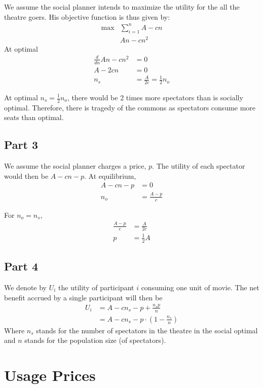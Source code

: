 \documentclass[]{article}
\newcommand{\e}{&=}
\begin{document}
We assume the social planner intends to maximize the utility for the all the theatre goers. His objective function is thus given by:
\begin{align*}
\max & \sum_{i=1}^{n} A - cn \\
	& An - cn^2
\end{align*}
At optimal
\begin{align*}
\frac{d}{dn} An - cn^2 \e 0 \\
A - 2cn \e 0 \\
n_s \e \frac{A}{2c} = \frac{1}{2} n_o
\end{align*}

At optimal $n_s = \frac{1}{2} n_o$, there would be 2 times more spectators than is socially optimal. Therefore, there is tragedy of the commons as spectators consume more seats than optimal.

\subsection*{Part 3}

We assume the social planner charges a price, $p$. The utility of each spectator would then be $A - cn - p$. At equilibrium,
\begin{align*}
A - cn - p \e 0 \\
n_{o} \e \frac{A - p}{c}
\end{align*}

For $n_o = n_s$,
\begin{align*}
\frac{A - p}{c} \e \frac{A}{2c} \\
p \e \frac{1}{2} A
\end{align*}

\subsection*{Part 4}

We denote by $U_i$ the utility of participant $i$ consuming one unit of movie. The net benefit accrued by a single participant will then be
\begin{align*}
U_i \e A - cn_s - p + \frac{n_sp}{n} \\
	\e A - cn_s - p \cdot \left( 1 - \frac{n_s}{n} \right)
\end{align*}
Where $n_s$ stands for the number of spectators in the theatre in the social optimal and $n$ stands for the population size (of spectators).

\newpage
\section*{Usage Prices}
\end{document}
